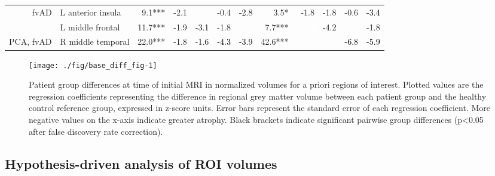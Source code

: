 \documentclass[]{article}
\begin{document}
\begin{table}[ht]
{\begin{tabular}{rlrrrrrrrrrr}
  fvAD & L anterior insula & 9.1*** & -2.1 & \cellcolor{blue}\textcolor{white}{-3.3} & -0.4 & \cellcolor{green}\textcolor{black}{-2.8} & 3.5* & -1.8 & -1.8 & -0.6 & \cellcolor{green}\textcolor{black}{-3.4} \\ 
   & L middle frontal & 11.7*** & -1.9 & \cellcolor{green}\textcolor{black}{-3.1} & -1.8 & \cellcolor{blue}\textcolor{white}{-4.3} & 7.7*** & \cellcolor{red}\textcolor{white}{-4.1} & \cellcolor{green}\textcolor{black}{-4.2} & \cellcolor{red}\textcolor{white}{-4.0} & -1.8 \\ 
  PCA, fvAD & R middle temporal & 22.0*** & -1.8 & -1.6 & \cellcolor{green}\textcolor{black}{-4.3} & \cellcolor{green}\textcolor{black}{-3.9} & 42.6*** & \cellcolor{red}\textcolor{white}{-10.9} & \cellcolor{red}\textcolor{white}{-9.5} & \cellcolor{green}\textcolor{black}{-6.8} & \cellcolor{green}\textcolor{black}{-5.9} \\ 
   \hline
\end{tabular}
}
\end{table}

\begin{figure}

{\centering \texttt{[image: ./fig/base\_diff\_fig-1]} 

}

\caption{Patient group differences at time of initial MRI in normalized volumes for a priori regions of interest. Plotted values are the regression coefficients representing the difference in regional grey matter volume between each patient group and the healthy control reference group, expressed in z-score units. Error bars represent the standard error of each regression coefficient. More negative values on the x-axis indicate greater atrophy. Black brackets indicate significant pairwise group differences (p<0.05 after false discovery rate correction).}\label{fig:base_diff_fig}
\end{figure}

\subsection*{Hypothesis-driven analysis of ROI
volumes}\label{hypothesis-driven-analysis-of-roi-volumes}
\end{document}
